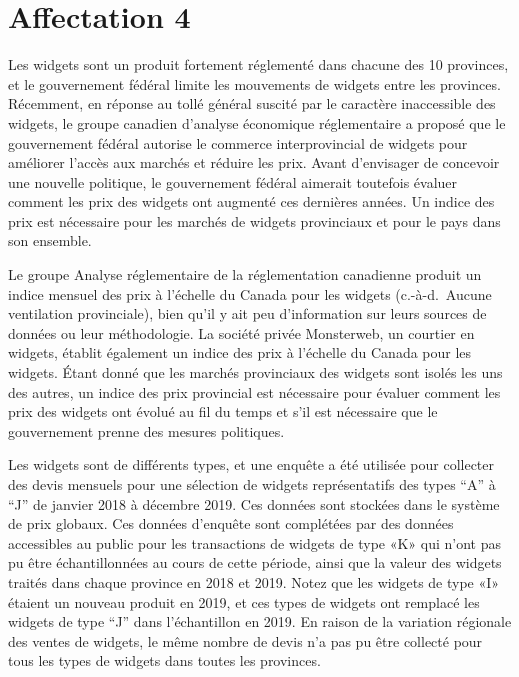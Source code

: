 \documentclass[
]{article}
\begin{document}
\hypertarget{affectation-4}{%
\section{Affectation 4}\label{affectation-4}}

Les widgets sont un produit fortement réglementé dans chacune des 10 provinces, et le gouvernement fédéral limite les mouvements de widgets entre les provinces. Récemment, en réponse au tollé général suscité par le caractère inaccessible des widgets, le groupe canadien d'analyse économique réglementaire a proposé que le gouvernement fédéral autorise le commerce interprovincial de widgets pour améliorer l'accès aux marchés et réduire les prix. Avant d'envisager de concevoir une nouvelle politique, le gouvernement fédéral aimerait toutefois évaluer comment les prix des widgets ont augmenté ces dernières années. Un indice des prix est nécessaire pour les marchés de widgets provinciaux et pour le pays dans son ensemble.

Le groupe Analyse réglementaire de la réglementation canadienne produit un indice mensuel des prix à l'échelle du Canada pour les widgets (c.-à-d.~Aucune ventilation provinciale), bien qu'il y ait peu d'information sur leurs sources de données ou leur méthodologie. La société privée Monsterweb, un courtier en widgets, établit également un indice des prix à l'échelle du Canada pour les widgets. Étant donné que les marchés provinciaux des widgets sont isolés les uns des autres, un indice des prix provincial est nécessaire pour évaluer comment les prix des widgets ont évolué au fil du temps et s'il est nécessaire que le gouvernement prenne des mesures politiques.

Les widgets sont de différents types, et une enquête a été utilisée pour collecter des devis mensuels pour une sélection de widgets représentatifs des types ``A'' à ``J'' de janvier 2018 à décembre 2019. Ces données sont stockées dans le système de prix globaux. Ces données d'enquête sont complétées par des données accessibles au public pour les transactions de widgets de type «K» qui n'ont pas pu être échantillonnées au cours de cette période, ainsi que la valeur des widgets traités dans chaque province en 2018 et 2019. Notez que les widgets de type «I» étaient un nouveau produit en 2019, et ces types de widgets ont remplacé les widgets de type ``J'' dans l'échantillon en 2019. En raison de la variation régionale des ventes de widgets, le même nombre de devis n'a pas pu être collecté pour tous les types de widgets dans toutes les provinces.
\end{document}
